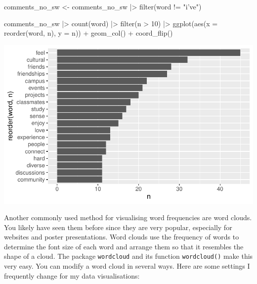 \documentclass[
  letterpaper,
  DIV=11,
  numbers=noendperiod]{scrreprt}
\newenvironment{Shaded}{\begin{snugshade}}{\end{snugshade}}
\newcommand{\AttributeTok}[1]{\textcolor[rgb]{0.40,0.45,0.13}{#1}}
\newcommand{\DecValTok}[1]{\textcolor[rgb]{0.68,0.00,0.00}{#1}}
\newcommand{\FunctionTok}[1]{\textcolor[rgb]{0.28,0.35,0.67}{#1}}
\newcommand{\NormalTok}[1]{\textcolor[rgb]{0.00,0.23,0.31}{#1}}
\newcommand{\OtherTok}[1]{\textcolor[rgb]{0.00,0.23,0.31}{#1}}
\newcommand{\SpecialCharTok}[1]{\textcolor[rgb]{0.37,0.37,0.37}{#1}}
\newcommand{\StringTok}[1]{\textcolor[rgb]{0.13,0.47,0.30}{#1}}
\begin{document}
\begin{Shaded}
\begin{Highlighting}[]
\NormalTok{comments\_no\_sw }\OtherTok{\textless{}{-}} 
\NormalTok{  comments\_no\_sw }\SpecialCharTok{|\textgreater{}}
  \FunctionTok{filter}\NormalTok{(word }\SpecialCharTok{!=} \StringTok{"i’ve"}\NormalTok{)}
  
\NormalTok{comments\_no\_sw }\SpecialCharTok{|\textgreater{}}
  \FunctionTok{count}\NormalTok{(word) }\SpecialCharTok{|\textgreater{}}
  \FunctionTok{filter}\NormalTok{(n }\SpecialCharTok{\textgreater{}} \DecValTok{10}\NormalTok{) }\SpecialCharTok{|\textgreater{}}
  \FunctionTok{ggplot}\NormalTok{(}\FunctionTok{aes}\NormalTok{(}\AttributeTok{x =} \FunctionTok{reorder}\NormalTok{(word, n),}
             \AttributeTok{y =}\NormalTok{ n)) }\SpecialCharTok{+}
  \FunctionTok{geom\_col}\NormalTok{() }\SpecialCharTok{+}
  \FunctionTok{coord\_flip}\NormalTok{()}
\end{Highlighting}
\end{Shaded}

\includegraphics{14_mixed_methods_files/figure-pdf/manually-remove-stopwords-1.pdf}

Another commonly used method for visualising word frequencies are word
clouds. You likely have seen them before since they are very popular,
especially for websites and poster presentations. Word clouds use the
frequency of words to determine the font size of each word and arrange
them so that it resembles the shape of a cloud. The package
\texttt{wordcloud} and its function \texttt{wordcloud()} make this very
easy. You can modify a word cloud in several ways. Here are some
settings I frequently change for my data visualisations:
\end{document}
